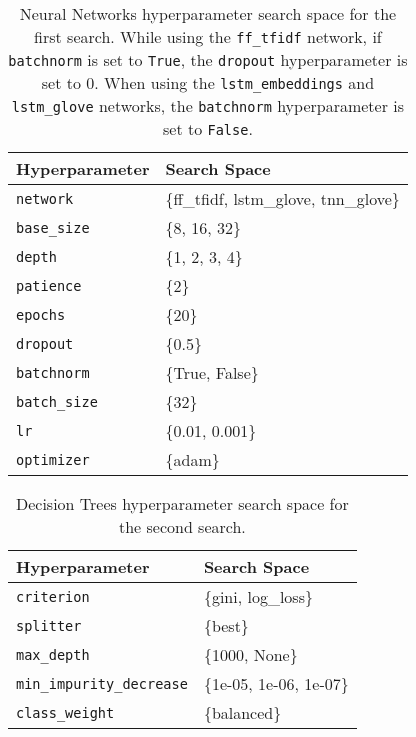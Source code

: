 \begin{table}[H]
\centering
\capstart
\begin{tabularx}{0.48\textwidth}{|l|X|}
\hline
Hyperparameter & Search Space \\
\hline
\texttt{network} & \{ff\_tfidf, lstm\_glove, tnn\_glove\} \\
\texttt{base\_size} & \{8, 16, 32\} \\
\texttt{depth} & \{1, 2, 3, 4\} \\
\texttt{patience} & \{2\} \\
\texttt{epochs} & \{20\} \\
\texttt{dropout} & \{0.5\} \\
\texttt{batchnorm} & \{True, False\} \\
\texttt{batch\_size} & \{32\} \\
\texttt{lr} & \{0.01, 0.001\} \\
\texttt{optimizer} & \{adam\} \\
\hline
\end{tabularx}
\caption{Neural Networks hyperparameter search space for the first search. While using the \texttt{ff\_tfidf} network, if \texttt{batchnorm} is set to \texttt{True}, the \texttt{dropout} hyperparameter is set to $0$. When using the \texttt{lstm\_embeddings} and \texttt{lstm\_glove} networks, the \texttt{batchnorm} hyperparameter is set to \texttt{False}.}
\label{tab:hyperparameters_neural_network_0}

\end{table}


\begin{table}[H]
\centering
\capstart
\begin{tabularx}{0.48\textwidth}{|l|X|}
\hline
Hyperparameter & Search Space \\
\hline
\texttt{criterion} & \{gini, log\_loss\} \\
\texttt{splitter} & \{best\} \\
\texttt{max\_depth} & \{1000, None\} \\
\texttt{min\_impurity\_decrease} & \{1e-05, 1e-06, 1e-07\} \\
\texttt{class\_weight} & \{balanced\} \\
\hline
\end{tabularx}
\caption{Decision Trees hyperparameter search space for the second search.}
\label{tab:hyperparameters_decision_tree_1}

\end{table}


